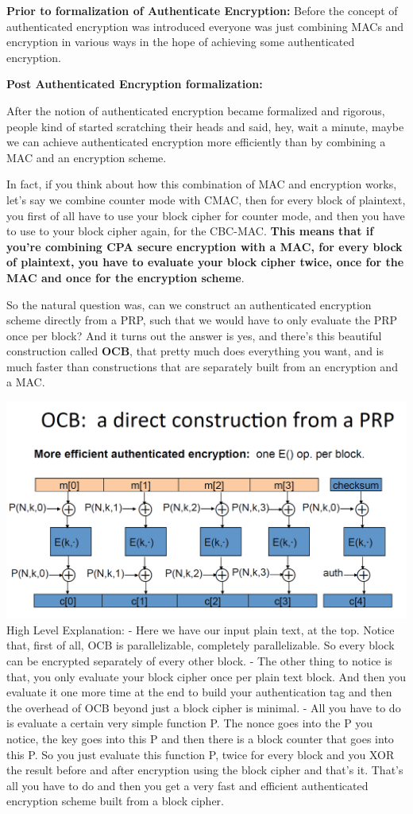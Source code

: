 \documentclass[11pt]{article}
\makeatletter
\def\maxwidth{\ifdim\Gin@nat@width>\linewidth\linewidth
    \else\Gin@nat@width\fi}
\let\Oldincludegraphics\includegraphics
\renewcommand{\includegraphics}[1]{\Oldincludegraphics[width=.8\maxwidth]{#1}}
\makeatother
\begin{document}
\textbf{Prior to formalization of Authenticate Encryption:} Before the
concept of authenticated encryption was introduced everyone was just
combining MACs and encryption in various ways in the hope of achieving
some authenticated encryption.

\textbf{Post Authenticated Encryption formalization:}

After the notion of authenticated encryption became formalized and
rigorous, people kind of started scratching their heads and said, hey,
wait a minute, maybe we can achieve authenticated encryption more
efficiently than by combining a MAC and an encryption scheme.

In fact, if you think about how this combination of MAC and encryption
works, let's say we combine counter mode with CMAC, then for every block
of plaintext, you first of all have to use your block cipher for counter
mode, and then you have to use to your block cipher again, for the
CBC-MAC. \textbf{This means that if you're combining CPA secure
encryption with a MAC, for every block of plaintext, you have to
evaluate your block cipher twice, once for the MAC and once for the
encryption scheme}.

So the natural question was, can we construct an authenticated
encryption scheme directly from a PRP, such that we would have to only
evaluate the PRP once per block? And it turns out the answer is yes, and
there's this beautiful construction called \textbf{OCB}, that pretty
much does everything you want, and is much faster than constructions
that are separately built from an encryption and a MAC.

\includegraphics{./Images/AE-OCB.png} High Level Explanation: - Here we
have our input plain text, at the top. Notice that, first of all, OCB is
parallelizable, completely parallelizable. So every block can be
encrypted separately of every other block. - The other thing to notice
is that, you only evaluate your block cipher once per plain text block.
And then you evaluate it one more time at the end to build your
authentication tag and then the overhead of OCB beyond just a block
cipher is minimal. - All you have to do is evaluate a certain very
simple function P. The nonce goes into the P you notice, the key goes
into this P and then there is a block counter that goes into this P. So
you just evaluate this function P, twice for every block and you XOR the
result before and after encryption using the block cipher and that's it.
That's all you have to do and then you get a very fast and efficient
authenticated encryption scheme built from a block cipher.
\end{document}
